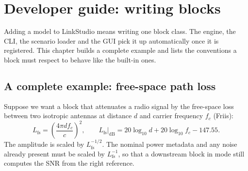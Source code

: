 \chapter{Developer guide: writing blocks}\label{ch:extending}

Adding a model to LinkStudio means writing one block class. The engine, the CLI, the scenario
loader and the GUI pick it up automatically once it is registered. This chapter builds a
complete example and lists the conventions a block must respect to behave like the built-in
ones.

\section{A complete example: free-space path loss}
Suppose we want a block that attenuates a radio signal by the free-space loss between two
isotropic antennas at distance $d$ and carrier frequency $f_c$ (Friis):
\begin{equation}
  L_{\mathrm{fs}} = \left(\frac{4\pi d f_c}{c}\right)^{2},\qquad
  L_{\mathrm{fs}}\big|_{\mathrm{dB}} = 20\log_{10} d + 20\log_{10} f_c - 147.55 .
\end{equation}
The amplitude is scaled by $L_{\mathrm{fs}}^{-1/2}$. The nominal power metadata and any noise
already present must be scaled by $L_{\mathrm{fs}}^{-1}$, so that a downstream  block
in  mode still computes the SNR from the right reference.

